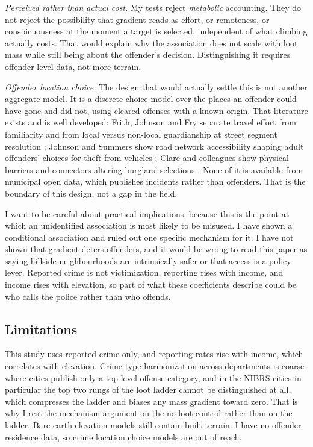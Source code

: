 \documentclass[10pt,letterpaper]{article}
\begin{document}
\emph{Perceived rather than actual cost.} My tests reject \emph{metabolic}
accounting. They do not reject the possibility that gradient reads as effort, or
remoteness, or conspicuousness at the moment a target is selected, independent of what
climbing actually costs. That would explain why the association does not scale with loot
mass while still being about the offender's decision. Distinguishing it requires
offender level data, not more terrain.

\emph{Offender location choice.} The design that would actually settle this is not
another aggregate model. It is a discrete choice model over the places an offender
could have gone and did not, using cleared offenses with a known origin. That
literature exists and is well developed: Frith, Johnson and Fry separate travel effort
from familiarity and from local versus non-local guardianship at street segment
resolution \cite{frith2017}; Johnson and Summers show road network accessibility
shaping adult offenders' choices for theft from vehicles \cite{johnsonsummers2015};
Clare and colleagues show physical barriers and connectors altering burglars'
selections \cite{clare2009}. None of it is available from municipal open data, which
publishes incidents rather than offenders. That is the boundary of this design, not a
gap in the field.

I want to be careful about practical implications, because this is the point at which
an unidentified association is most likely to be misused. I have shown a conditional
association and ruled out one specific mechanism for it. I have not shown that
gradient deters offenders, and it would be wrong to read this paper as saying hillside
neighbourhoods are intrinsically safer or that access is a policy lever. Reported
crime is not victimization, reporting rises with income, and income rises with
elevation, so part of what these coefficients describe could be who calls the police
rather than who offends.

\subsection*{Limitations}

This study uses reported crime only, and reporting rates rise with income, which
correlates with elevation. Crime type harmonization across departments is coarse where
cities publish only a top level offense category, and in the NIBRS cities in
particular the top two rungs of the loot ladder cannot be distinguished at all, which
compresses the ladder and biases any mass gradient toward zero. That is why I rest the
mechanism argument on the no-loot control rather than on the ladder. Bare earth
elevation models still contain built terrain. I have no offender residence data, so
crime location choice models are out of reach.
\end{document}
